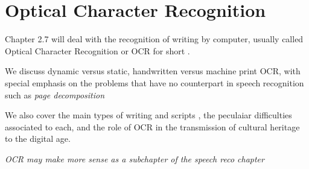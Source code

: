 \section{Optical Character Recognition}


Chapter 2.7 will deal with the recognition of writing by computer, usually
called Optical Character Recognition or OCR for short \citep{Bunke:1997}.

We discuss dynamic versus static, handwritten versus machine print OCR, with
special emphasis on the problems that have no counterpart in speech
recognition such as {\it page decomposition} \citep{OGorman:1995}

We also cover the main types of writing and scripts \citep{Sproat:2000}, the
peculaiar difficulties associated to each, and the role of OCR in the
transmission of cultural heritage to the digital age.

{\it OCR may make more sense as a subchapter of the speech reco chapter}

\printbibliography %


